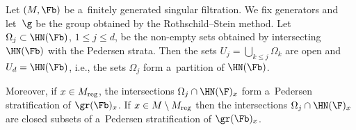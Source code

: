 \begin{thm}\label{Theorem:Stratification-InText}
 Let $(M,\Fb)$ be a~finitely generated singular filtration. We fix generators and let~$\g$ be the group obtained by the Rothschild--Stein method.
 Let $\Omega_j \subset \HN(\Fb)$, $1\leq j \leq d$, be the non-empty sets obtained by intersecting $\HN(\Fb)$ with the Pedersen strata. Then the sets $U_j=\bigcup_{k\leq j}\Omega_k$ are open and $U_d = \HN(\Fb)$, i.e., the sets $\Omega_j$ form a~partition of $\HN(\Fb)$.

 Moreover, if $x \in M_{\rm reg}$, the intersections $\Omega_j\cap \HN(\F)_x$ form a~Pedersen stratification of $\gr(\Fb)_x$. If $x\in M\setminus M_{\rm reg}$ then the intersections $\Omega_j\cap \HN(\F)_x$ are closed subsets of a~Pedersen stratification of $\gr(\Fb)_x$.
\end{thm}


















































































